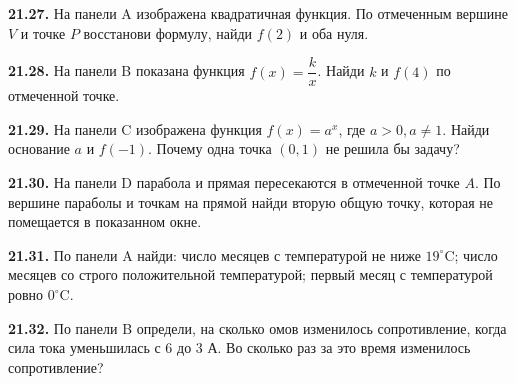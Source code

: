 \noindent\begin{minipage}[t]{\linewidth}\textbf{21.27.} На панели A изображена квадратичная функция. По отмеченным вершине \(V\) и точке \(P\) восстанови формулу, найди \(f(2)\) и оба нуля.\par\end{minipage}\par
\noindent\begin{minipage}[t]{\linewidth}\textbf{21.28.} На панели B показана функция \(f(x)=\dfrac{k}{x}\). Найди \(k\) и \(f(4)\) по отмеченной точке.\par\end{minipage}\par
\noindent\begin{minipage}[t]{\linewidth}\textbf{21.29.} На панели C изображена функция \(f(x)=a^x\), где \(a>0,a\ne1\). Найди основание \(a\) и \(f(-1)\). Почему одна точка \((0,1)\) не решила бы задачу?\par\end{minipage}\par
\noindent\begin{minipage}[t]{\linewidth}\textbf{21.30.}\starmark{} На панели D парабола и прямая пересекаются в отмеченной точке \(A\). По вершине параболы и точкам на прямой найди вторую общую точку, которая не помещается в показанном окне.\par\end{minipage}\par
\noindent\begin{minipage}[t]{\linewidth}\textbf{21.31.} По панели A найди: число месяцев с температурой не ниже \(19^\circ\mathrm C\); число месяцев со строго положительной температурой; первый месяц с температурой ровно \(0^\circ\mathrm C\).\par\end{minipage}\par
\noindent\begin{minipage}[t]{\linewidth}\textbf{21.32.} По панели B определи, на сколько омов изменилось сопротивление, когда сила тока уменьшилась с \(6\) до \(3\) А. Во сколько раз за это время изменилось сопротивление?\par\end{minipage}\par
\endgroup
